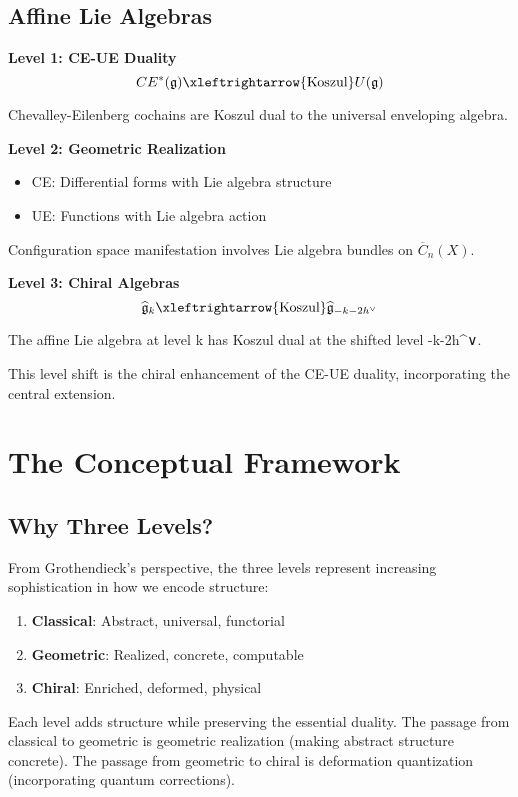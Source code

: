 \subsection{Affine Lie Algebras}

\begin{example}\label{ex:affine-three-levels}

\textbf{Level 1: CE-UE Duality}
$$CE^*(\mathfrak{g}) \xleftrightarrow{\text{Koszul}} U(\mathfrak{g})$$

Chevalley-Eilenberg cochains are Koszul dual to the universal enveloping algebra.

\textbf{Level 2: Geometric Realization}
\begin{itemize}
\item CE: Differential forms with Lie algebra structure
\item UE: Functions with Lie algebra action
\end{itemize}

Configuration space manifestation involves Lie algebra bundles on $\overline{C}_n(X)$.

\textbf{Level 3: Chiral Algebras}
$$\widehat{\mathfrak{g}}_k \xleftrightarrow{\text{Koszul}} \widehat{\mathfrak{g}}_{-k-2h^\vee}$$

The affine Lie algebra at level k has Koszul dual at the shifted level -k-2h^∨.

This level shift is the chiral enhancement of the CE-UE duality, incorporating the central extension.
\end{example}

\section{The Conceptual Framework}

\subsection{Why Three Levels?}

\begin{remark}\label{rem:grothendieck-three-levels}
From Grothendieck's perspective, the three levels represent increasing sophistication in how we encode structure:

\begin{enumerate}
\item \textbf{Classical}: Abstract, universal, functorial
\item \textbf{Geometric}: Realized, concrete, computable
\item \textbf{Chiral}: Enriched, deformed, physical
\end{enumerate}

Each level adds structure while preserving the essential duality. The passage from classical to geometric is geometric realization (making abstract structure concrete). The passage from geometric to chiral is deformation quantization (incorporating quantum corrections).
\end{remark}

